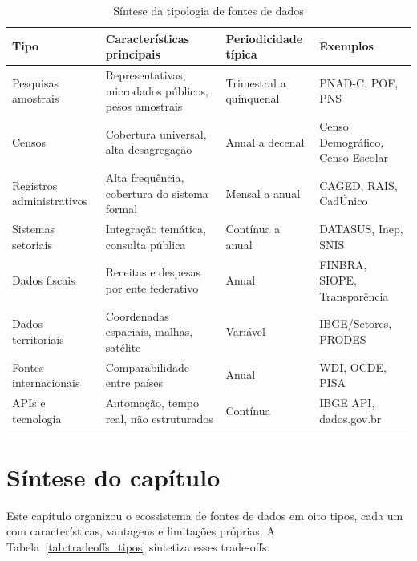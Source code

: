 \begin{table}[H]
\centering
\caption{Síntese da tipologia de fontes de dados}
\label{tab:tipologia}
\small
\begin{tabularx}{\textwidth}{@{} p{3.2cm} X p{2.8cm} p{3cm} @{}}
\toprule
\textbf{Tipo} & \textbf{Características principais} & \textbf{Periodicidade típica} & \textbf{Exemplos} \\
\midrule
Pesquisas amostrais & Representativas, microdados públicos, pesos amostrais & Trimestral a quinquenal & PNAD-C, POF, PNS \\
\addlinespace
Censos & Cobertura universal, alta desagregação & Anual a decenal & Censo Demográfico, Censo Escolar \\
\addlinespace
Registros administrativos & Alta frequência, cobertura do sistema formal & Mensal a anual & CAGED, RAIS, CadÚnico \\
\addlinespace
Sistemas setoriais & Integração temática, consulta pública & Contínua a anual & DATASUS, Inep, SNIS \\
\addlinespace
Dados fiscais & Receitas e despesas por ente federativo & Anual & FINBRA, SIOPE, Transparência \\
\addlinespace
Dados territoriais & Coordenadas espaciais, malhas, satélite & Variável & IBGE/Setores, PRODES \\
\addlinespace
Fontes internacionais & Comparabilidade entre países & Anual & WDI, OCDE, PISA \\
\addlinespace
APIs e tecnologia & Automação, tempo real, não estruturados & Contínua & IBGE API, dados.gov.br \\
\bottomrule
\end{tabularx}
\end{table}

\section{Síntese do capítulo}

Este capítulo organizou o ecossistema de fontes de dados em oito tipos, cada um com características, vantagens e limitações próprias. A Tabela~\ref{tab:tradeoffs_tipos} sintetiza esses trade-offs.

